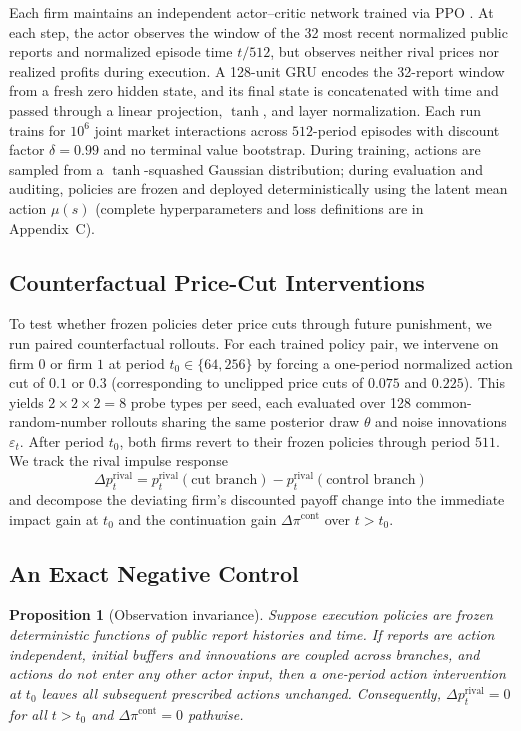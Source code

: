\documentclass{article}
\newtheorem{proposition}{Proposition}
\begin{document}
Each firm maintains an independent actor--critic network trained via PPO \citep{schulman2017proximal}. At each step, the actor observes the window of the 32 most recent normalized public reports and normalized episode time $t/512$, but observes neither rival prices nor realized profits during execution. A 128-unit GRU encodes the 32-report window from a fresh zero hidden state, and its final state is concatenated with time and passed through a linear projection, $\tanh$, and layer normalization. Each run trains for $10^6$ joint market interactions across $512$-period episodes with discount factor $\delta=0.99$ and no terminal value bootstrap. During training, actions are sampled from a $\tanh$-squashed Gaussian distribution; during evaluation and auditing, policies are frozen and deployed deterministically using the latent mean action $\mu(s)$ (complete hyperparameters and loss definitions are in Appendix~C).

\subsection{Counterfactual Price-Cut Interventions}

To test whether frozen policies deter price cuts through future punishment, we run paired counterfactual rollouts. For each trained policy pair, we intervene on firm $0$ or firm $1$ at period $t_0\in\{64,256\}$ by forcing a one-period normalized action cut of $0.1$ or $0.3$ (corresponding to unclipped price cuts of $0.075$ and $0.225$). This yields $2\times 2\times 2=8$ probe types per seed, each evaluated over 128 common-random-number rollouts sharing the same posterior draw $\theta$ and noise innovations $\varepsilon_t$. After period $t_0$, both firms revert to their frozen policies through period $511$. We track the rival impulse response
\[
\Delta p^{\mathrm{rival}}_t
= p^{\mathrm{rival}}_t(\text{cut branch})
- p^{\mathrm{rival}}_t(\text{control branch})
\]
and decompose the deviating firm's discounted payoff change into the immediate impact gain at $t_0$ and the continuation gain $\Delta\pi^{\mathrm{cont}}$ over $t>t_0$.

\subsection{An Exact Negative Control}

\begin{proposition}[Observation invariance]\label{prop:invariance}
Suppose execution policies are frozen deterministic functions of public report histories and time. If reports are action independent, initial buffers and innovations are coupled across branches, and actions do not enter any other actor input, then a one-period action intervention at $t_0$ leaves all subsequent prescribed actions unchanged. Consequently, $\Delta p^{\mathrm{rival}}_t = 0$ for all $t > t_0$ and $\Delta\pi^{\mathrm{cont}} = 0$ pathwise.
\end{proposition}
\end{document}
